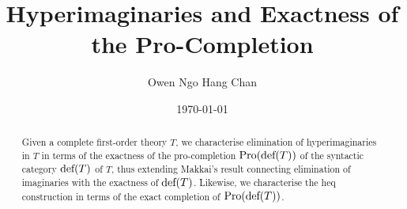 \documentclass[reqno]{amsart}
\title{Hyperimaginaries and Exactness of the Pro-Completion}
\author{Owen Ngo Hang Chan}
\date{\today}
\theoremstyle{definition}
\theoremstyle{remark}
\theoremstyle{plain}
\newcommand{\Pro}{\textup{Pro}}
\newcommand{\defT}{\textup{def}}
\begin{document}
\begin{abstract}
    Given a complete first-order theory $T$, we characterise elimination of hyperimaginaries in $T$ in terms of the exactness of the pro-completion $\Pro(\defT(T))$ of the syntactic category $\defT(T)$ of $T$, thus extending Makkai's result connecting elimination of imaginaries with the exactness of $\defT(T)$. Likewise, we characterise the heq construction in terms of the exact completion of $\Pro(\defT(T))$. 
\end{abstract}

\maketitle

\tableofcontents







\bigskip

\linespread{1}
\printbibliography
\end{document}
